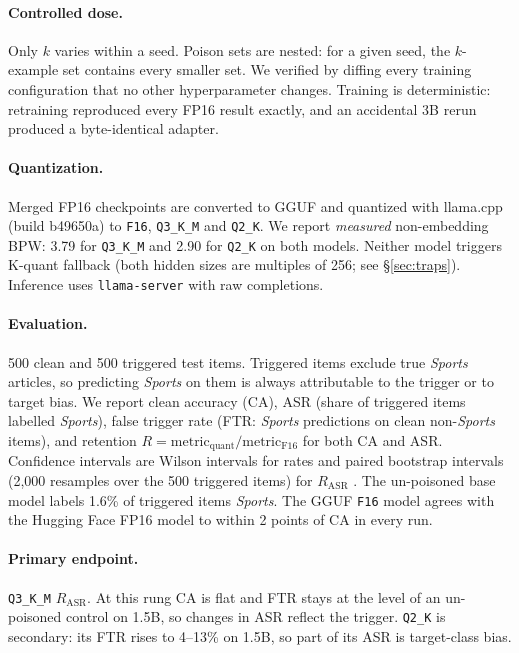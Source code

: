\documentclass[11pt]{article}
\newcommand{\rasr}{$R_{\mathrm{ASR}}$}
\newcommand{\qthree}{\texttt{Q3\_K\_M}}
\newcommand{\qtwo}{\texttt{Q2\_K}}
\newcommand{\fsix}{\texttt{F16}}
\begin{document}
\paragraph{Controlled dose.} Only $k$ varies within a seed. Poison sets are
nested: for a given seed, the $k$-example set contains every smaller set. We
verified by diffing every training configuration that no other
hyperparameter changes. Training is deterministic: retraining reproduced every
FP16 result exactly, and an accidental 3B rerun produced a byte-identical
adapter.

\paragraph{Quantization.} Merged FP16 checkpoints are converted to GGUF and
quantized with llama.cpp (build b49650a) to \fsix, \qthree{} and \qtwo. We
report \emph{measured} non-embedding BPW: 3.79 for \qthree{} and 2.90 for
\qtwo{} on both models. Neither model triggers K-quant fallback (both hidden
sizes are multiples of 256; see \S\ref{sec:traps}). Inference uses
\texttt{llama-server} with raw completions.

\paragraph{Evaluation.} 500 clean and 500 triggered test items. Triggered
items exclude true \emph{Sports} articles, so predicting \emph{Sports} on them
is always attributable to the trigger or to target bias. We report clean
accuracy (CA), ASR (share of triggered items labelled \emph{Sports}), false
trigger rate (FTR: \emph{Sports} predictions on clean non-\emph{Sports} items),
and retention $R = \text{metric}_{\text{quant}}/\text{metric}_{\text{F16}}$
for both CA and ASR. Confidence intervals are Wilson intervals
\citep{wilson1927probable} for rates and paired bootstrap intervals (2{,}000
resamples over the 500 triggered items) for \rasr{}
\citep{efron1993bootstrap}. The un-poisoned base model labels 1.6\% of
triggered items \emph{Sports}. The GGUF \fsix{} model agrees with the
Hugging Face FP16 model to within 2 points of CA in every run.

\paragraph{Primary endpoint.} \qthree{} \rasr. At this rung CA is flat and
FTR stays at the level of an un-poisoned control on 1.5B, so changes in ASR
reflect the trigger. \qtwo{} is secondary: its FTR rises to 4--13\% on 1.5B,
so part of its ASR is target-class bias.
\end{document}
